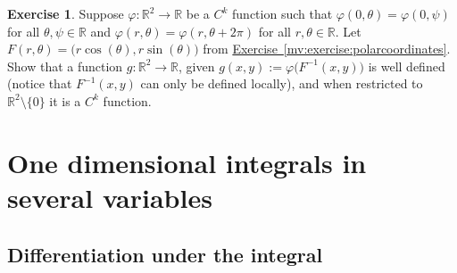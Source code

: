 \documentclass[12pt]{book}
\newcommand{\R}{{\mathbb{R}}}
\newcommand{\sectionnewpage}{\clearpage}
\theoremstyle{plain}
\theoremstyle{remark}
\theoremstyle{definition}
\theoremstyle{exercise}
\newtheorem{exercise}{Exercise}[section]
\theoremstyle{example}
\newcommand{\exerciseref}[1]{\hyperref[#1]{Exercise~\ref*{#1}}}
\begin{document}
\begin{exercise}
Suppose $\varphi \colon \R^2 \to \R$ be a $C^k$ function
such that
$\varphi(0,\theta) = \varphi(0,\psi)$ for all $\theta,\psi \in \R$
and
$\varphi(r,\theta) = \varphi(r,\theta+2\pi)$ for all $r,\theta \in \R$.
Let $F(r,\theta) = \bigl(r \cos(\theta), r \sin(\theta) \bigr)$ from 
\exerciseref{mv:exercise:polarcoordinates}.  Show that a function
$g \colon \R^2 \to \R$, given
$g(x,y) := \varphi \bigl(F^{-1}(x,y)\bigr)$ is well defined (notice that
$F^{-1}(x,y)$ can only be defined locally), and
when restricted to $\R^2 \setminus \{ 0 \}$ it is a $C^k$ function.
\end{exercise}



\chapter{One dimensional integrals in several variables} \label{path:chapter}


\section{Differentiation under the integral}
\label{sec:diffunderint}
\end{document}
